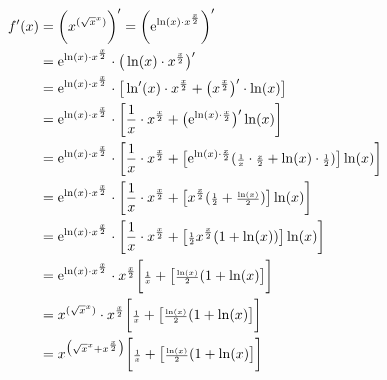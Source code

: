 \begin{align*}
f'(x)&=\bigg(x^{(\sqrt{x}^x)}\bigg)'=\bigg(\mathrm{e}^{\ln(x)\cdot x^{\frac{x}{2}}}\bigg)'\\
&=\mathrm{e}^{\ln(x)\cdot x^{\frac{x}{2}}}\cdot\big(\ln(x)\cdot x^{\frac{x}{2}}\big)'\\
&=\mathrm{e}^{\ln(x)\cdot x^{\frac{x}{2}}}\cdot \big[\ln'(x)\cdot x^{\frac{x}{2}}+\big(x^{\frac{x}{2}}\big)'\cdot \ln(x)\big]\\
&=\mathrm{e}^{\ln(x)\cdot x^{\frac{x}{2}}}\cdot\bigg[\frac{1}{x}\cdot x^{\frac{x}{2}}+\big(\mathrm{e}^{\ln(x)\cdot \frac{x}{2}}\big)'\ln(x)\bigg]\\
&=\mathrm{e}^{\ln(x)\cdot x^{\frac{x}{2}}}\cdot\bigg[\frac{1}{x}\cdot x^{\frac{x}{2}}+\big[\mathrm{e}^{\ln(x)\cdot \frac{x}{2}}(\genfrac{}{}{}{2}{1 }{x }\cdot \genfrac{}{}{}{2}{x }{2 }+\ln(x)\cdot \genfrac{}{}{}{2}{1}{2 })\big]\ln(x)\bigg]\\
&=\mathrm{e}^{\ln(x)\cdot x^{\frac{x}{2}}}\cdot \bigg[\frac{1}{x}\cdot x^{\frac{x}{2}}+\big[ x^{\frac{x}{2}}(\genfrac{}{}{}{2}{1 }{2 }+ \genfrac{}{}{}{2}{\ln(x)}{2 })\big]\ln(x)\bigg]\\
&=\mathrm{e}^{\ln(x)\cdot x^{\frac{x}{2}}}\cdot\bigg[\frac{1}{x}\cdot x^{\frac{x}{2}}+\big[\genfrac{}{}{}{2}{1 }{2} x^{\frac{x}{2}}(1+ \ln(x))\big]\ln(x)\bigg]\\
&=\mathrm{e}^{\ln(x)\cdot x^{\frac{x}{2}}}\cdot x^{\frac{x}{2}}\bigg[\genfrac{}{}{}{2}{1 }{x }+\big[\genfrac{}{}{}{2}{\ln(x) }{2 }(1+\ln(x)\big ]\bigg ]\\
&=x^{(\sqrt{x}^x)}\cdot x^{\frac{x}{2}}\bigg[\genfrac{}{}{}{2}{1 }{x }+\big[\genfrac{}{}{}{2}{\ln(x) }{2 }(1+\ln(x)\big ]\bigg ]\\
&=x^{\big(\sqrt{x}^x+x^{\frac{x}{2}}\big)}\bigg[\genfrac{}{}{}{2}{1 }{x }+\big[\genfrac{}{}{}{2}{\ln(x) }{2 }(1+\ln(x)\big ]\bigg ]\\
\end{align*}
